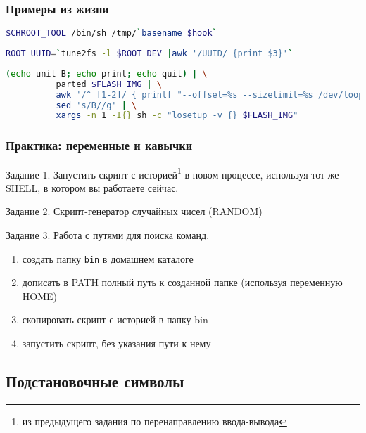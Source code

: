 \begin{frame}[fragile]
  \frametitle{Примеры из жизни}
  \begin{lstlisting}[language=sh,frame=single,basicstyle=\normalsize,breaklines=true]
    $CHROOT_TOOL /bin/sh /tmp/`basename $hook`
  \end{lstlisting} \pause

  \begin{lstlisting}[language=sh,frame=single,basicstyle=\normalsize,breaklines=true]
    ROOT_UUID=`tune2fs -l $ROOT_DEV |awk '/UUID/ {print $3}'`
  \end{lstlisting} \pause
  
  \begin{lstlisting}[language=sh,frame=single,basicstyle=\small,breaklines=true]
    (echo unit B; echo print; echo quit) | \
          parted $FLASH_IMG | \
          awk '/^ [1-2]/ { printf "--offset=%s --sizelimit=%s /dev/loop%s\n", $2, $4, $1 }' | \
          sed 's/B//g' | \
          xargs -n 1 -I{} sh -c "losetup -v {} $FLASH_IMG"
  \end{lstlisting}
\end{frame}

\begin{frame}[fragile]
  \frametitle{Практика: переменные и кавычки}
  
  \normalsize{ }
  \alert{Задание 1.}
  Запустить скрипт с историей\footnote{из предыдущего задания по перенаправлению ввода-вывода} в новом процессе, используя тот же SHELL, в котором вы работаете сейчас.  \pause

  \alert{Задание 2.}
  Скрипт-генератор случайных чисел (RANDOM) \pause

  \alert{Задание 3.} Работа с путями для поиска команд.
    \begin{enumerate}
      \item создать папку \verb+bin+ в домашнем каталоге
      \item дописать в PATH полный путь к созданной папке (используя переменную HOME)
      \item скопировать скрипт с историей в папку bin
      \item запустить скрипт, без указания пути к нему 
    \end{enumerate}

\end{frame}

\subsection{Подстановочные символы}

